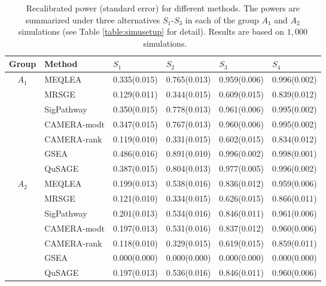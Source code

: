 \documentclass[useAMS,usenatbib, galley]{biom}
\newcommand{\CMR}{CAMERA-rank}
\newcommand{\CMT}{CAMERA-modt}
\newcommand{\gent}{SigPathway}
\newcommand{\genr}{MRSGE}
\newcommand{\HowmanySimu}{$1,000$}
\begin{document}
	\begin{table*}[ht]
			\centering
			\caption{Recalibrated power (standard error) for different methods. The powers are summarized under three alternatives $S_1$-$S_3$ in each of the group $A_1$ and $A_2$ simulations (see Table \ref{table:simusetup} for detail). Results are based on \HowmanySimu~simulations. }\label{table:power}
		\begin{tabular}{cl M{2.5cm}M{2.5cm}M{2.5cm}M{2.5cm}}
			\hline\hline
		Group & Method	& $S_1$ & $S_2$ & $S_3$	&$S_4$  \\ 
			\hline
		 &	MEQLEA & 0.335(0.015) & 0.765(0.013) & 0.959(0.006) & 0.996(0.002) \\ 
		&	\genr & 0.129(0.011) & 0.344(0.015) & 0.609(0.015) & 0.839(0.012) \\ 
		&	\gent & 0.350(0.015) & 0.778(0.013) & 0.961(0.006) & 0.995(0.002) \\ 
		&	\CMT & 0.347(0.015) & 0.767(0.013) & 0.960(0.006) & 0.995(0.002) \\ 
		&	\CMR & 0.119(0.010) & 0.331(0.015) & 0.602(0.015) & 0.834(0.012) \\ 
		&	GSEA & 0.486(0.016) & 0.891(0.010) & 0.996(0.002) & 0.998(0.001) \\ 
		&	QuSAGE & 0.387(0.015) & 0.804(0.013) & 0.977(0.005) & 0.996(0.002) \\ 
				\hline	
		 &	MEQLEA & 0.199(0.013) & 0.538(0.016) & 0.836(0.012) & 0.959(0.006) \\ 
		&		\genr & 0.121(0.010) & 0.334(0.015) & 0.626(0.015) & 0.866(0.011) \\ 
		&		\gent & 0.201(0.013) & 0.534(0.016) & 0.846(0.011) & 0.961(0.006) \\ 
		&		\CMT & 0.197(0.013) & 0.531(0.016) & 0.837(0.012) & 0.960(0.006) \\ 
		&		\CMR & 0.118(0.010) & 0.329(0.015) & 0.619(0.015) & 0.859(0.011) \\ 
		&		GSEA & 0.000(0.000) & 0.000(0.000) & 0.000(0.000) & 0.000(0.000) \\ 
		&		QuSAGE & 0.197(0.013) & 0.536(0.016) & 0.846(0.011) & 0.960(0.006) \\ 
				\hline\hline
		\end{tabular}
	\end{table*}
	
	
	
\end{document}
